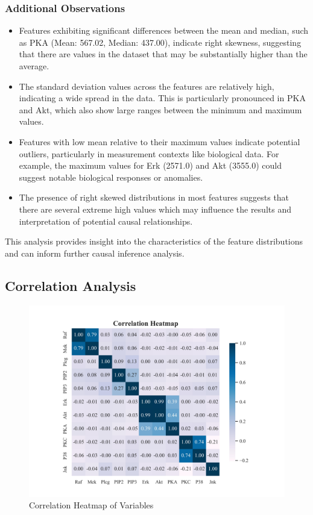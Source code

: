 \documentclass{article}
\begin{document}
\subsubsection{Additional Observations}
\begin{itemize}
\item Features exhibiting significant differences between the mean and median, such as PKA (Mean: 567.02, Median: 437.00), indicate right skewness, suggesting that there are values in the dataset that may be substantially higher than the average.
\item The standard deviation values across the features are relatively high, indicating a wide spread in the data. This is particularly pronounced in PKA and Akt, which also show large ranges between the minimum and maximum values.
\item Features with low mean relative to their maximum values indicate potential outliers, particularly in measurement contexts like biological data. For example, the maximum values for Erk (2571.0) and Akt (3555.0) could suggest notable biological responses or anomalies.
\item The presence of right skewed distributions in most features suggests that there are several extreme high values which may influence the results and interpretation of potential causal relationships. 
\end{itemize}

This analysis provides insight into the characteristics of the feature distributions and can inform further causal inference analysis.

\subsection{Correlation Analysis}

\begin{figure}[H]
\centering
\includegraphics[width=0.8\linewidth]{dataset/sachs/output_graph/eda_corr.jpg}
\caption{\label{fig:corr}Correlation Heatmap of Variables}
\end{figure}
\end{document}
